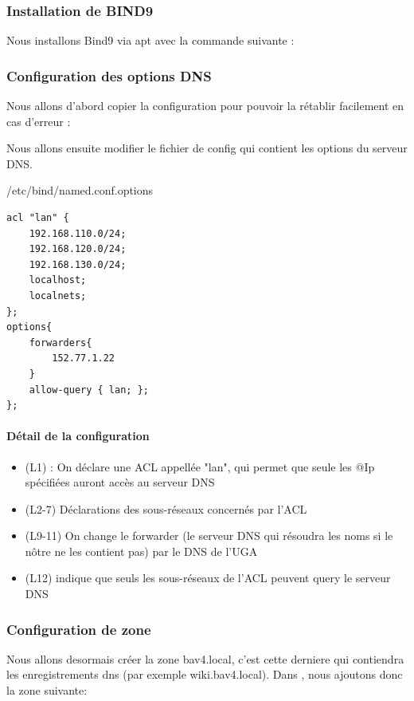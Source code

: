 \documentclass{article}
\begin{document}
\subsubsection{Installation de BIND9}
Nous installons Bind9 via apt avec la commande suivante :

\subsubsection{Configuration des options DNS}
Nous allons d'abord copier la configuration pour pouvoir la rétablir facilement en cas d'erreur :

Nous allons ensuite modifier le fichier de config  qui contient les options du serveur DNS.	
\begin{configbox}{/etc/bind/named.conf.options}
\begin{lstlisting}
acl "lan" {
	192.168.110.0/24;
	192.168.120.0/24;
	192.168.130.0/24;
	localhost;
	localnets;
};
options{ 
	forwarders{
		152.77.1.22
	}
	allow-query { lan; }; 
};
\end{lstlisting}
\end{configbox}
\paragraph{Détail de la configuration}
\begin{itemize}
	\item (L1)  : On déclare une ACL appellée "lan", qui permet que seule les @Ip spécifiées auront accès au serveur DNS
	\item (L2-7) Déclarations des sous-réseaux concernés par l'ACL
	\item (L9-11) On change le forwarder (le serveur DNS qui résoudra les noms si le nôtre ne les contient pas) par le DNS de l'UGA
	\item (L12)  indique que seuls les sous-réseaux de l'ACL peuvent query le serveur DNS
\end{itemize}

\subsubsection{Configuration de zone} 
Nous allons desormais créer la zone bav4.local, c'est cette derniere qui contiendra les enregistrements dns (par exemple wiki.bav4.local). Dans , nous ajoutons donc la zone suivante:
\end{document}
